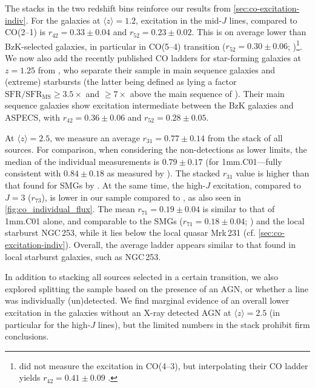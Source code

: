 \documentclass[twocolumn]{aastex62}
\newcommand{\avg}[1]{\ensuremath{\langle #1 \rangle}}
\newcommand{\rFourTwostack}{\ensuremath{0.33 \pm 0.04}}
\newcommand{\rFiveTwostack}{\ensuremath{0.23 \pm 0.02}}
\newcommand{\rThreeOnestack}{\ensuremath{0.77 \pm 0.14}}
\newcommand{\rSevenOnestack}{\ensuremath{0.19 \pm 0.04}}
\begin{document}
The stacks in the two redshift bins reinforce our results from
\autoref{sec:co-excitation-indiv}.  For the galaxies at $\avg{z}=1.2$,
excitation in the mid-$J$ lines, compared to CO(2--1) is
$r_{42} = \rFourTwostack$ and $r_{52} = \rFiveTwostack$.  This is on average
lower than BzK-selected galaxies, in particular in CO(5--4) transition
($r_{52} = 0.30\pm0.06$; \citealt{Daddi2015})\footnote{\cite{Daddi2015} did not
  measure the excitation in CO(4--3), but interpolating their CO ladder yields
  $r_{42}=0.41 \pm 0.09$ \citep[see][for details]{Decarli2016b}.}.  We now also
add the recently published CO ladders for star-forming galaxies at $z=1.25$
from \cite{Valentino2020b}, who separate their sample in main sequence galaxies
and (extreme) starbursts (the latter being defined as lying a factor
$\mathrm{SFR}/\mathrm{SFR}_{\mathrm{MS}} \ge 3.5 \times$ and $\ge 7\times$
above the main sequence of \citealt{Sargent2014}).  Their main sequence
galaxies show excitation intermediate between the BzK galaxies and ASPECS, with
$r_{42} = 0.36 \pm 0.06$ and $r_{52} = 0.28 \pm 0.05$.

At $\avg{z}=2.5$, we measure an average $r_{31} = \rThreeOnestack$ from the
stack of all sources.  For comparison, when considering the non-detections as
lower limits, the median of the individual measurements is $0.79 \pm 0.17$ (for
1mm.C01---fully consistent with $0.84 \pm 0.18$ as measured by
\citealt{Riechers2020b}).  The stacked $r_{31}$ value is higher than that found
for SMGs by \cite[][$r_{31} = 0.52 \pm 0.09$]{Bothwell2013}.  At the same time,
the high-$J$ excitation, compared to $J=3$ ($r_{73}$), is lower in our sample
compared to \cite{Bothwell2013}, as also seen in
\autoref{fig:co_individual_flux}.  The mean $r_{71} = \rSevenOnestack$ is
similar to that of 1mm.C01 alone, and comparable to the SMGs
($r_{71}=0.18 \pm 0.04$; \citealt{Bothwell2013}) and the local starburst
NGC\,253, while it lies below the local quasar Mrk\,231
(cf. \autoref{sec:co-excitation-indiv}).  Overall, the average ladder appears
similar to that found in local starburst galaxies, such as NGC\,253.

In addition to stacking all sources selected in a certain transition, we also
explored splitting the sample based on the presence of an AGN, or whether a
line was individually (un)detected.  We find marginal evidence of an overall
lower excitation in the galaxies without an X-ray detected AGN at $\avg{z}=2.5$
(in particular for the high-$J$ lines), but the limited numbers in the stack
prohibit firm conclusions.
\end{document}
